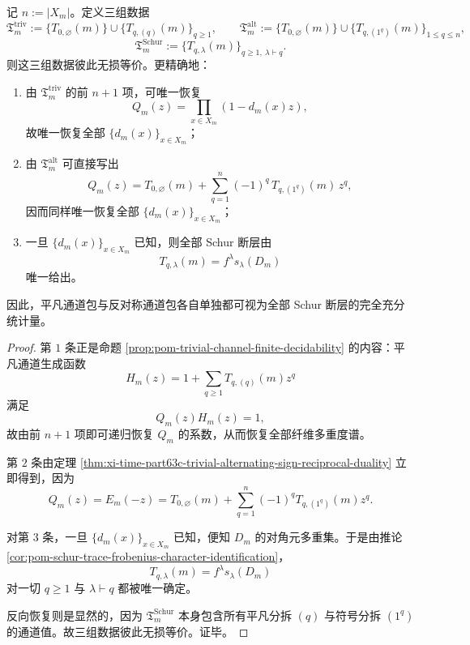 \begin{theorem}\label{thm:xi-time-part63c-trivial-alternating-schur-complete-sufficiency}
记 \(n:=|X_m|\)。定义三组数据
\[
\mathfrak T_m^{\mathrm{triv}}
:=
\{T_{0,\varnothing}(m)\}\cup\{T_{q,(q)}(m)\}_{q\ge 1},
\qquad
\mathfrak T_m^{\mathrm{alt}}
:=
\{T_{0,\varnothing}(m)\}\cup\{T_{q,(1^q)}(m)\}_{1\le q\le n},
\]
\[
\mathfrak T_m^{\mathrm{Schur}}
:=
\{T_{q,\lambda}(m)\}_{q\ge 1,\ \lambda\vdash q}.
\]
则这三组数据彼此无损等价。更精确地：
\begin{enumerate}
  \item 由 \(\mathfrak T_m^{\mathrm{triv}}\) 的前 \(n+1\) 项，可唯一恢复
  \[
  Q_m(z)=\prod_{x\in X_m}(1-d_m(x)z),
  \]
  故唯一恢复全部 \(\{d_m(x)\}_{x\in X_m}\)；
  \item 由 \(\mathfrak T_m^{\mathrm{alt}}\) 可直接写出
  \[
  \boxed{\;
  Q_m(z)=T_{0,\varnothing}(m)+\sum_{q=1}^{n}(-1)^q\,T_{q,(1^q)}(m)\,z^q,\;}
  \]
  因而同样唯一恢复全部 \(\{d_m(x)\}_{x\in X_m}\)；
  \item 一旦 \(\{d_m(x)\}_{x\in X_m}\) 已知，则全部 Schur 断层由
  \[
  T_{q,\lambda}(m)=f^\lambda s_\lambda(D_m)
  \]
  唯一给出。
\end{enumerate}
因此，平凡通道包与反对称通道包各自单独都可视为全部 Schur 断层的完全充分统计量。
\end{theorem}
\begin{proof}
第 \(1\) 条正是命题 \ref{prop:pom-trivial-channel-finite-decidability} 的内容：平凡通道生成函数
\[
H_m(z)=1+\sum_{q\ge 1}T_{q,(q)}(m)z^q
\]
满足
\[
Q_m(z)H_m(z)=1,
\]
故由前 \(n+1\) 项即可递归恢复 \(Q_m\) 的系数，从而恢复全部纤维多重度谱。

第 \(2\) 条由定理 \ref{thm:xi-time-part63c-trivial-alternating-sign-reciprocal-duality} 立即得到，因为
\[
Q_m(z)=E_m(-z)
=
T_{0,\varnothing}(m)+\sum_{q=1}^{n}(-1)^qT_{q,(1^q)}(m)z^q.
\]

对第 \(3\) 条，一旦 \(\{d_m(x)\}_{x\in X_m}\) 已知，便知 \(D_m\) 的对角元多重集。于是由推论
\ref{cor:pom-schur-trace-frobenius-character-identification}，
\[
T_{q,\lambda}(m)=f^\lambda s_\lambda(D_m)
\]
对一切 \(q\ge 1\) 与 \(\lambda\vdash q\) 都被唯一确定。

反向恢复则是显然的，因为 \(\mathfrak T_m^{\mathrm{Schur}}\) 本身包含所有平凡分拆 \((q)\) 与符号分拆 \((1^q)\) 的通道值。故三组数据彼此无损等价。证毕。
\end{proof}

